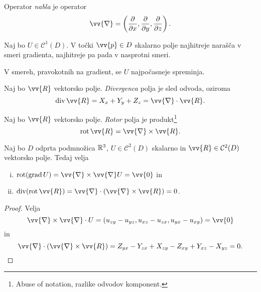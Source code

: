 \begin{definicija}
Operator \emph{nabla} je operator
\[
\vv{\nabla} = \left(
\frac{\partial}{\partial x},
\frac{\partial}{\partial y},
\frac{\partial}{\partial z}
\right).
\]
\end{definicija}

\begin{trditev}
Naj bo $U \in \mathcal{C}^1(D)$. V točki $\vv{p} \in D$
skalarno polje najhitreje narašča v smeri gradienta, najhitreje pa
pada v nasprotni smeri.
\end{trditev}

\obvs

\begin{opomba}
V smereh, pravokotnih na gradient, se $U$ najpočasneje
spreminja.
\end{opomba}

\begin{definicija}
Naj bo $\vv{R}$ vektorsko polje.
\emph{Divergenca} polja je sled odvoda,
oziroma
\[
\dv \vv{R} = X_x + Y_y + Z_z = \vv{\nabla} \cdot \vv{R}.
\]
\end{definicija}

\begin{definicija}
Naj bo $\vv{R}$ vektorsko polje. \emph{Rotor}
polja je produkt\footnote{Abuse of notation, razlike odvodov
komponent.}
\[
\rot \vv{R} = \vv{\nabla} \times \vv{R}.
\]
\end{definicija}

\begin{trditev}
Naj bo $D$ odprta podmnožica $\mathbb{R}^3$,
$U \in \mathcal{C}^2(D)$ skalarno in
$\vv{R} \in \mathcal{C}^2(D)$ vektorsko polje. Tedaj velja

\begin{enumerate}[i)]
\item $\rot(\grad U) =
\vv{\nabla} \times \vv{\nabla} U = \vv{0}$ in
\item $\dv(\rot \vv{R}) =
\vv{\nabla} \cdot \left(\vv{\nabla} \times \vv{R}\right) = 0$.
\end{enumerate}
\end{trditev}

\begin{proof}
Velja
\[
\vv{\nabla} \times \vv{\nabla} \cdot U =
(u_{zy} - u_{yz}, u_{xz} - u_{zx}, u_{yx} - u_{xy}) =
\vv{0}
\]
in
\[
\vv{\nabla} \cdot \left(\vv{\nabla} \times \vv{R}\right) =
Z_{yx} - Y_{zx} + X_{zy} - Z_{xy} + Y_{xz} - X_{yz} =
0. \qedhere
\]
\end{proof}

